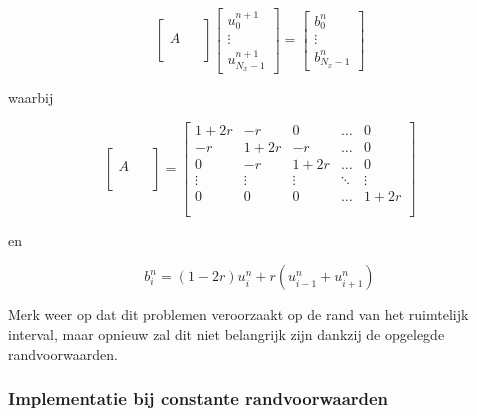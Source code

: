 \documentclass[a4paper,kulak]{kulakarticle} %
\begin{document}
\begin{equation}
	\begin{bmatrix}
		\qquad \\
		A \\
		\\ 
	\end{bmatrix}
	\begin{bmatrix}
		u_0^{n+1} \\
		\vdots \\
		u_{N_x - 1}^{n+1}
	\end{bmatrix}
	=
	\begin{bmatrix}
		b_0^n \\
		\vdots \\
		b_{N_x - 1}^n
	\end{bmatrix}
	\label{eq:impl_matrix}	
\end{equation}

waarbij

\begin{equation*}
	\begin{bmatrix}
		\qquad \\
		A \\
		\\ 
	\end{bmatrix}
	=
	\begin{bmatrix}
		1+2r	&	-r		&	0		&	\dots	&	0 		\\
		-r		&	1+2r	&	-r		&	\dots	&	0		\\
		0		&	-r		&	1+2r	&	\dots	&	0		\\
		\vdots	&	\vdots	&	\vdots	&	\ddots	&	\vdots	\\
		0		&	0		&	0		&	\dots	&	1+2r	\\
		\\ 
	\end{bmatrix}
\end{equation*}

en

\begin{equation*}
	b_i^n = (1-2r)u_i^n + r(u_{i-1}^n + u_{i+1}^n)
\end{equation*}

Merk weer op dat dit problemen veroorzaakt op de rand van het ruimtelijk interval, maar opnieuw zal dit niet belangrijk zijn dankzij de opgelegde randvoorwaarden. 

\subsubsection{Implementatie bij constante randvoorwaarden}
\label{sec:implementatie_impliciet_constant}
\end{document}
